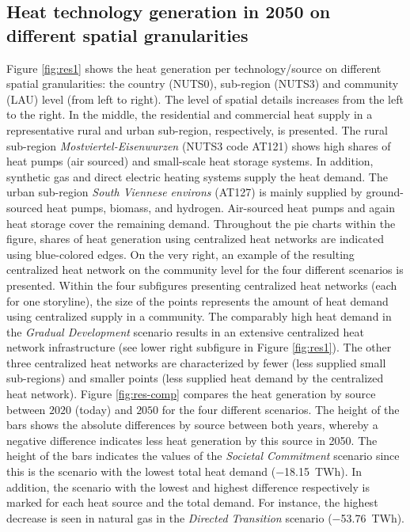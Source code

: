 \subsection{Heat technology generation in 2050 on different spatial granularities}\label{res:2}
Figure \ref{fig:res1} shows the heat generation per technology/source on different spatial granularities: the country (NUTS0), sub-region (NUTS3) and community (LAU) level (from left to right). The level of spatial details increases from the left to the right. In the middle, the residential and commercial heat supply in a representative rural and urban sub-region, respectively, is presented. The rural sub-region \textit{Mostviertel-Eisenwurzen} (NUTS3 code AT121) shows high shares of heat pumps (air sourced) and small-scale heat storage systems. In addition, synthetic gas and direct electric heating systems supply the heat demand. The urban sub-region \textit{South Viennese environs} (AT127) is mainly supplied by ground-sourced heat pumps, biomass, and hydrogen. Air-sourced heat pumps and again heat storage cover the remaining demand. Throughout the pie charts within the figure, shares of heat generation using centralized heat networks are indicated using blue-colored edges. On the very right, an example of the resulting centralized heat network on the community level for the four different scenarios is presented. Within the four subfigures presenting centralized heat networks (each for one storyline), the size of the points represents the amount of heat demand using centralized supply in a community. The comparably high heat demand in the \textit{Gradual Development} scenario results in an extensive centralized heat network infrastructure (see lower right subfigure in Figure \ref{fig:res1}). The other three centralized heat networks are characterized by fewer (less supplied small sub-regions) and smaller points (less supplied heat demand by the centralized heat network). Figure \ref{fig:res-comp} compares the heat generation by source between $2020$ (today) and $2050$ for the four different scenarios. The height of the bars shows the absolute differences by source between both years, whereby a negative difference indicates less heat generation by this source in 2050. The height of the bars indicates the values of the \textit{Societal Commitment} scenario since this is the scenario with the lowest total heat demand (\SI{-18.15}{TWh}). In addition, the scenario with the lowest and highest difference respectively is marked for each heat source and the total demand. For instance, the highest decrease is seen in natural gas in the \textit{Directed Transition} scenario (\SI{-53.76}{TWh}).

